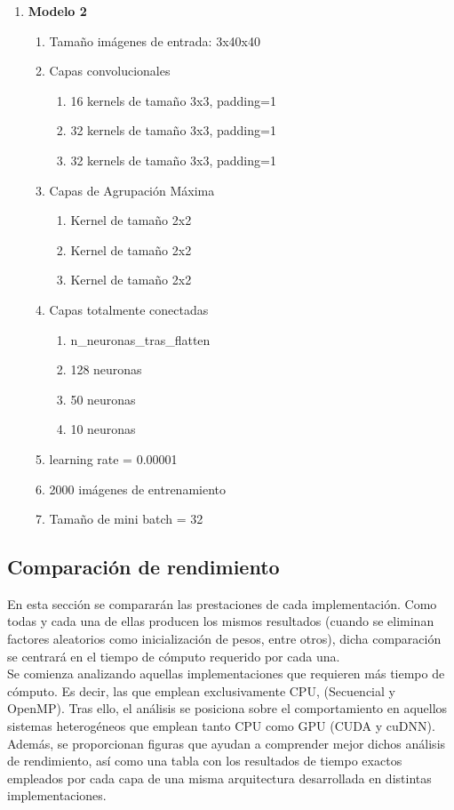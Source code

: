 \begin{enumerate}
	\item \textbf{Modelo 2}
	\begin{enumerate}[label=\textbullet, nosep]
		\item Tamaño imágenes de entrada: 3x40x40
		\item Capas convolucionales
		\begin{enumerate}[label=\textbullet, nosep]
			\item 16 kernels de tamaño 3x3, padding=1
			\item 32 kernels de tamaño 3x3, padding=1
			\item 32 kernels de tamaño 3x3, padding=1
		\end{enumerate}
		\item Capas de Agrupación Máxima
		\begin{enumerate}[label=\textbullet, nosep]
			\item Kernel de tamaño 2x2
			\item Kernel de tamaño 2x2
			\item Kernel de tamaño 2x2
		\end{enumerate}
		\item Capas totalmente conectadas
		\begin{enumerate}[label=\textbullet, nosep]
			\item n\_neuronas\_tras\_flatten
			\item 128 neuronas
			\item 50 neuronas
			\item 10 neuronas
		\end{enumerate}
		\item learning rate = 0.00001
		\item 2000 imágenes de entrenamiento
		\item Tamaño de mini batch = 32
	\end{enumerate}	
\end{enumerate}

\newpage

\subsection{Comparación de rendimiento}

En esta sección se compararán las prestaciones de cada implementación. Como todas y cada una de ellas producen los mismos resultados (cuando se eliminan factores aleatorios como inicialización de pesos, entre otros), dicha comparación se centrará en el tiempo de cómputo requerido por cada una. \\
Se comienza analizando aquellas implementaciones que requieren más tiempo de cómputo. Es decir, las que emplean exclusivamente CPU, (Secuencial y OpenMP). Tras ello, el análisis se posiciona sobre el comportamiento en aquellos sistemas heterogéneos que emplean tanto CPU como GPU (CUDA y cuDNN). \\
Además, se proporcionan figuras que ayudan a comprender mejor dichos análisis de rendimiento, así como una tabla con los resultados de tiempo exactos empleados por cada capa de una misma arquitectura desarrollada en distintas implementaciones.

